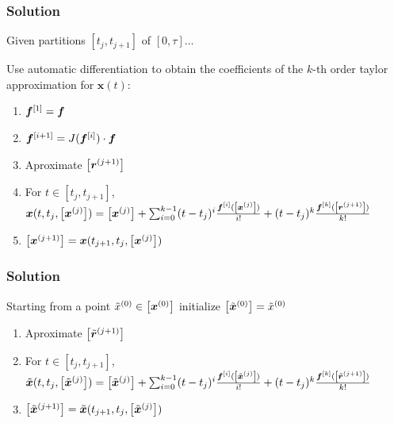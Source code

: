 \documentclass{beamer}
\begin{document}

\begin{frame}
    \frametitle{Solution}

    Given partitions $[t_j, t_{j+1}]$ of $[0, \tau]$...
 
    \vspace{7mm}
    Use automatic differentiation to obtain the coefficients of the $k$-th order taylor approximation for $\bm{x}(t)$:

    \begin{enumerate}
        \item $\bm{f}^{[1]} = \bm{f}$

        \vspace{2mm}
        \item $\bm{f}^{[i+1]} = J(\bm{f}^{[i]}) \cdot \bm{f}$

        \vspace{2mm}
        \item Aproximate $\left[\bm{r}^{(j+1)}\right]$

        \vspace{2mm}
        \item For $t \in [t_j, t_{j+1}]$, $\bm{x}(t, t_j, \left[\bm{x}^{(j)}\right]) = \left[\bm{x}^{(j)}\right] + \sum^{k-1}_{i=0} (t - t_j)^i \frac{\bm{f}^{[i]}(\left[\bm{x}^{(j)}\right])}{i!} + (t - t_j)^k \frac{\bm{f}^{[k]}(\left[\bm{r}^{(j+1)}\right])}{k!}$

        \vspace{2mm}
        \item $\left[\bm{x}^{(j+1)}\right] = \bm{x}(t_{j+1}, t_j, \left[\bm{x}^{(j)}\right])$
    \end{enumerate}
    
\end{frame}


\begin{frame}
    \frametitle{Solution}

    Starting from a point $\tilde{x}^{(0)} \in \left[\bm{x}^{(0)}\right]$ initialize $\left[\tilde{\bm{x}}^{(0)}\right] = \tilde{x}^{(0)}$

    \begin{enumerate}
        \item Aproximate $\left[\tilde{\bm{r}}^{(j+1)}\right]$

        \vspace{2mm}
        \item For $t \in [t_j, t_{j+1}]$, $\tilde{\bm{x}}(t, t_j, \left[\tilde{\bm{x}}^{(j)}\right]) = \left[\tilde{\bm{x}}^{(j)}\right] + \sum^{k-1}_{i=0} (t - t_j)^i \frac{\bm{f}^{[i]}(\left[\tilde{\bm{x}}^{(j)}\right])}{i!} + (t - t_j)^k \frac{\bm{f}^{[k]}(\left[\tilde{\bm{r}}^{(j+1)}\right])}{k!}$

        \vspace{2mm}
        \item $\left[\tilde{\bm{x}}^{(j+1)}\right] = \tilde{\bm{x}}(t_{j+1}, t_j, \left[\tilde{\bm{x}}^{(j)}\right])$
    \end{enumerate}
    
\end{frame}
\end{document}
